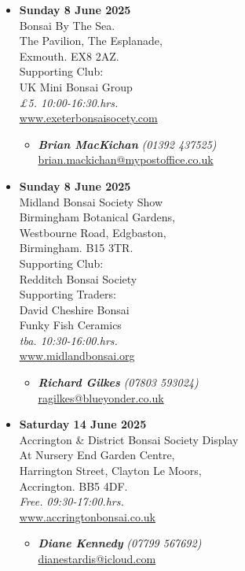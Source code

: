 \begin{itemize}
    \item \textbf{Sunday 8 June 2025}
    \\
    Bonsai By The Sea. \\
    The Pavilion, The Esplanade, \\
    Exmouth. EX8 2AZ. \\
    Supporting Club: \\
    UK Mini Bonsai Group
    \\
    \emph{£5. 10:00-16:30.hrs.}
    \\
    \href{http://www.exeterbonsaisocety.com/}{www.exeterbonsaisocety.com}
    \begin{itemize}
        \item \textbf{\emph{Brian MacKichan}} \emph{(01392 437525)} \\
        \href{mailto:brian.mackichan@mypostoffice.co.uk}{brian.mackichan@mypostoffice.co.uk} 
    \end{itemize}

    \item \textbf{Sunday 8 June 2025}
    \\
    Midland Bonsai Society Show \\
    Birmingham Botanical Gardens, \\
    Westbourne Road, Edgbaston, \\
    Birmingham. B15 3TR. \\
    Supporting Club: \\
    Redditch Bonsai Society \\
    Supporting Traders: \\
    David Cheshire Bonsai \\
    Funky Fish Ceramics
    \\
    \emph{tba. 10:30-16:00.hrs.}
    \\
    \href{https://www.midlandbonsai.org}{www.midlandbonsai.org}
    \begin{itemize}
        \item \textbf{\emph{Richard Gilkes}} \emph{(07803 593024)} \\
        \href{mailto:ragilkes@blueyonder.co.uk}{ragilkes@blueyonder.co.uk} 
    \end{itemize}

    \item \textbf{Saturday 14 June 2025}
    \\
    Accrington \& District Bonsai Society Display \\
    At Nursery End Garden Centre, \\
    Harrington Street, Clayton Le Moors, \\
    Accrington. BB5 4DF.
    \\
    \emph{Free. 09:30-17:00.hrs.}
    \\
    \href{https://www.accringtonbonsai.co.uk}{www.accringtonbonsai.co.uk}
    \begin{itemize}
        \item \textbf{\emph{Diane Kennedy}} \emph{(07799 567692)} \\
        \href{mailto:dianestardis@icloud.com}{dianestardis@icloud.com} 
    \end{itemize}


\end{itemize}
